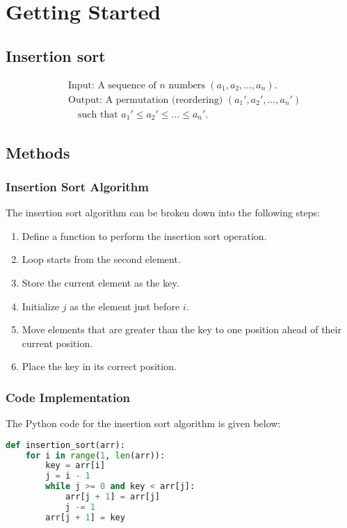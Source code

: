 \documentclass{book}
\begin{document}

\chapter{Getting Started}
\section{Insertion sort}
    \begin{align*}
        &\text{Input: A sequence of } n \text{ numbers } (a_1, a_2, \ldots, a_n). \\
        &\text{Output: A permutation (reordering) } (a_1', a_2', \ldots, a_n') \\
        &\quad \text{such that } a_1' \leq a_2' \leq \ldots \leq a_n'.
    \end{align*}
\section*{Methods}
\subsection{Insertion Sort Algorithm}

The insertion sort algorithm can be broken down into the following steps:

\begin{enumerate}
    \item Define a function to perform the insertion sort operation.
    \item Loop starts from the second element.
    \item Store the current element as the key.
    \item Initialize \( j \) as the element just before \( i \).
    \item Move elements that are greater than the key to one position ahead of their current position.
    \item Place the key in its correct position.
\end{enumerate}

\subsection{Code Implementation}

The Python code for the insertion sort algorithm is given below:

\begin{lstlisting}[language=Python]
def insertion_sort(arr):
    for i in range(1, len(arr)):
        key = arr[i]
        j = i - 1
        while j >= 0 and key < arr[j]:
            arr[j + 1] = arr[j]
            j -= 1
        arr[j + 1] = key
\end{lstlisting}
\end{document}
